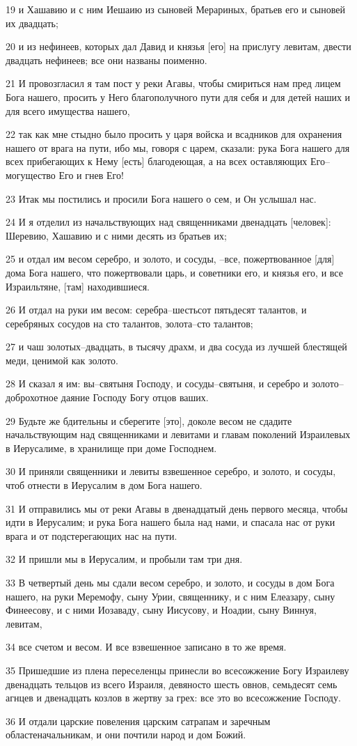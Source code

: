 \par 19 и Хашавию и с ним Иешаию из сыновей Мерариных, братьев его и сыновей их двадцать;
\par 20 и из нефинеев, которых дал Давид и князья [его] на прислугу левитам, двести двадцать нефинеев; все они названы поименно.
\par 21 И провозгласил я там пост у реки Агавы, чтобы смириться нам пред лицем Бога нашего, просить у Него благополучного пути для себя и для детей наших и для всего имущества нашего,
\par 22 так как мне стыдно было просить у царя войска и всадников для охранения нашего от врага на пути, ибо мы, говоря с царем, сказали: рука Бога нашего для всех прибегающих к Нему [есть] благодеющая, а на всех оставляющих Его--могущество Его и гнев Его!
\par 23 Итак мы постились и просили Бога нашего о сем, и Он услышал нас.
\par 24 И я отделил из начальствующих над священниками двенадцать [человек]: Шеревию, Хашавию и с ними десять из братьев их;
\par 25 и отдал им весом серебро, и золото, и сосуды, --все, пожертвованное [для] дома Бога нашего, что пожертвовали царь, и советники его, и князья его, и все Израильтяне, [там] находившиеся.
\par 26 И отдал на руки им весом: серебра--шестьсот пятьдесят талантов, и серебряных сосудов на сто талантов, золота--сто талантов;
\par 27 и чаш золотых--двадцать, в тысячу драхм, и два сосуда из лучшей блестящей меди, ценимой как золото.
\par 28 И сказал я им: вы--святыня Господу, и сосуды--святыня, и серебро и золото--доброхотное даяние Господу Богу отцов ваших.
\par 29 Будьте же бдительны и сберегите [это], доколе весом не сдадите начальствующим над священниками и левитами и главам поколений Израилевых в Иерусалиме, в хранилище при доме Господнем.
\par 30 И приняли священники и левиты взвешенное серебро, и золото, и сосуды, чтоб отнести в Иерусалим в дом Бога нашего.
\par 31 И отправились мы от реки Агавы в двенадцатый день первого месяца, чтобы идти в Иерусалим; и рука Бога нашего была над нами, и спасала нас от руки врага и от подстерегающих нас на пути.
\par 32 И пришли мы в Иерусалим, и пробыли там три дня.
\par 33 В четвертый день мы сдали весом серебро, и золото, и сосуды в дом Бога нашего, на руки Меремофу, сыну Урии, священнику, и с ним Елеазару, сыну Финеесову, и с ними Иозаваду, сыну Иисусову, и Ноадии, сыну Виннуя, левитам,
\par 34 все счетом и весом. И все взвешенное записано в то же время.
\par 35 Пришедшие из плена переселенцы принесли во всесожжение Богу Израилеву двенадцать тельцов из всего Израиля, девяносто шесть овнов, семьдесят семь агнцев и двенадцать козлов в жертву за грех: все это во всесожжение Господу.
\par 36 И отдали царские повеления царским сатрапам и заречным областеначальникам, и они почтили народ и дом Божий.

